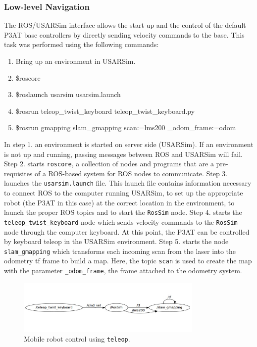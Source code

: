 \subsubsection*{Low-level Navigation}
The ROS/USARSim interface allows the start-up and the control of the default P3AT base controllers by directly sending velocity commands to the base. This task was performed using the following commands:
\begin{enumerate}
\item\footnotesize{Bring up an environment in USARSim.        }
\item\footnotesize{\$roscore}
\item\footnotesize{\$roslaunch usarsim usarsim.launch}
\item\footnotesize{\$rosrun teleop\_twist\_keyboard teleop\_twist\_keyboard.py}
\item\footnotesize{\$rosrun gmapping slam\_gmapping scan:=lms200 \_odom\_frame:=odom}
\end{enumerate}

In step 1. an environment is started on server side (USARSim). If an environment is not up and running, passing messages between ROS and USARSim will fail. Step 2. starts \texttt{roscore}, a collection of nodes and programs that are a pre-requisites of a ROS-based system for ROS nodes to communicate. Step 3. launches the \texttt{usarsim.launch} file. This launch file contains information necessary to connect ROS to the computer running USARSim, to set up the appropriate robot (the P3AT in this case) at the correct location in the environment, to launch the proper ROS topics and to start the \texttt{RosSim} node. Step 4. starts the \texttt{teleop\_twist\_keyboard} node which sends velocity commands to the \texttt{RosSim} node through the computer keyboard. At this point, the P3AT can be controlled by keyboard teleop in the USARSim environment. Step 5. starts the node \texttt{slam\_gmapping} which transforms each incoming scan from the laser into the odometry tf frame to build a map. Here, the topic \texttt{scan} is used to create the map with the parameter \texttt{\_odom\_frame}, the frame attached to the odometry system.

\begin{figure}[t!]
\centering
\includegraphics[width=9cm]{Figures/Misc/low-level.jpg}
\caption{Mobile robot control using \texttt{teleop}.}\label{fig:teleop}
\end{figure}

